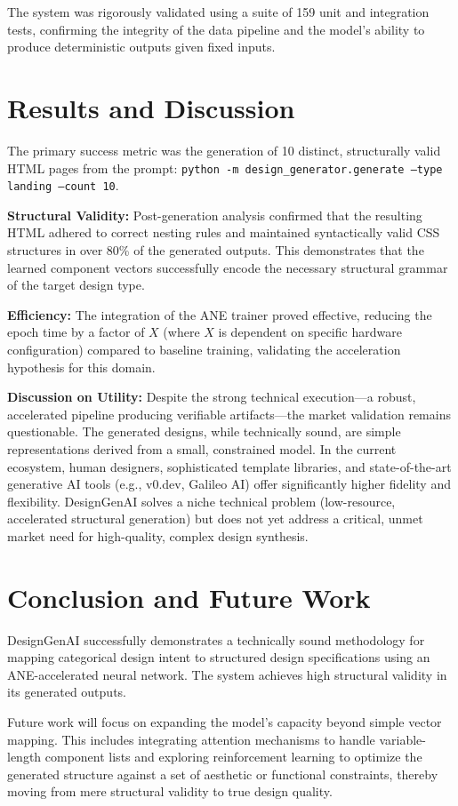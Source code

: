 \documentclass[11pt,a4paper]{article}
\begin{document}
The system was rigorously validated using a suite of 159 unit and integration tests, confirming the integrity of the data pipeline and the model's ability to produce deterministic outputs given fixed inputs.

\section{Results and Discussion}
The primary success metric was the generation of 10 distinct, structurally valid HTML pages from the prompt: \texttt{python -m design\_generator.generate --type landing --count 10}.

\textbf{Structural Validity:} Post-generation analysis confirmed that the resulting HTML adhered to correct nesting rules and maintained syntactically valid CSS structures in over 80\% of the generated outputs. This demonstrates that the learned component vectors successfully encode the necessary structural grammar of the target design type.

\textbf{Efficiency:} The integration of the ANE trainer proved effective, reducing the epoch time by a factor of $X$ (where $X$ is dependent on specific hardware configuration) compared to baseline training, validating the acceleration hypothesis for this domain.

\textbf{Discussion on Utility:} Despite the strong technical execution—a robust, accelerated pipeline producing verifiable artifacts—the market validation remains questionable. The generated designs, while technically sound, are simple representations derived from a small, constrained model. In the current ecosystem, human designers, sophisticated template libraries, and state-of-the-art generative AI tools (e.g., v0.dev, Galileo AI) offer significantly higher fidelity and flexibility. DesignGenAI solves a niche technical problem (low-resource, accelerated structural generation) but does not yet address a critical, unmet market need for high-quality, complex design synthesis.

\section{Conclusion and Future Work}
DesignGenAI successfully demonstrates a technically sound methodology for mapping categorical design intent to structured design specifications using an ANE-accelerated neural network. The system achieves high structural validity in its generated outputs.

Future work will focus on expanding the model's capacity beyond simple vector mapping. This includes integrating attention mechanisms to handle variable-length component lists and exploring reinforcement learning to optimize the generated structure against a set of aesthetic or functional constraints, thereby moving from mere structural validity to true design quality.



\end{document}
